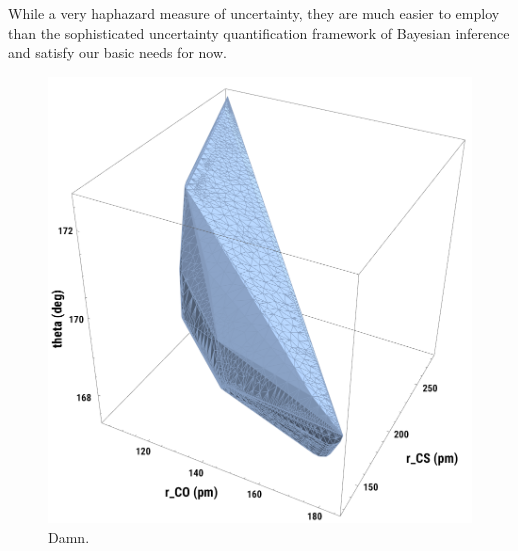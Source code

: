 While a very haphazard measure of uncertainty, they are much easier to employ than the sophisticated uncertainty quantification framework of Bayesian inference and satisfy our basic needs for now.


\begin{figure}
  \centering
  \includegraphics[width=\textwidth]{Gfx/3DConvexHull}
  \caption[Damn.]
  {Damn.}
  \label{fig:3DConvexHull}
\end{figure}


